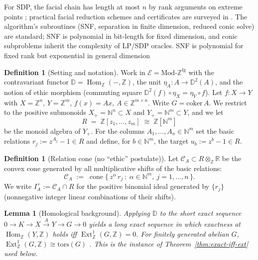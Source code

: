 \documentclass[12pt]{article}
\newcommand{\E}{\mathcal{E}}
\newcommand{\DD}{\mathbb{D}}
\newcommand{\Hom}{\operatorname{Hom}}
\newcommand{\Ext}{\operatorname{Ext}}
\theoremstyle{plain}
\newtheorem{lemma}[theorem]{Lemma}
\theoremstyle{definition}
\newtheorem{definition}[theorem]{Definition}
\theoremstyle{remark}
\numberwithin{equation}{section}
\begin{document}
For SDP, the facial chain has length at most $n$ by rank arguments on extreme points \cite{Pataki1998}; practical facial reduction schemes and certificates are surveyed in \cite{Pataki2013}. The algorithm's subroutines (SNF, separation in finite dimension, reduced conic solve) are standard; SNF is polynomial in bit-length for fixed dimension, and conic subproblems inherit the complexity of LP/SDP oracles. SNF is polynomial for fixed rank but exponential in general dimension

\begin{definition}[Setting and notation]
Work in $\E=\mathrm{Mod}\text{-}\mathbb Z^{\mathrm{fg}}$ with the contravariant functor $\DD=\Hom_{\mathbb Z}(-,\mathbb Z)$, the unit $\eta_A:A\to \DD^2(A)$, and the notion of ethic morphism (commuting square $\DD^2(f)\circ \eta_X=\eta_Y\circ f$). Let $f:X\to Y$ with $X=\mathbb Z^n$, $Y=\mathbb Z^m$, $f(x)=Ax$, $A\in\mathbb Z^{m\times n}$. Write $G=\mathrm{coker}\,A$. We restrict to the positive submonoids $X_+=\mathbb N^n\subset X$ and $Y_+=\mathbb N^m\subset Y$, and we let
\[
R \;=\; \mathbb Z[z_1,\dots,z_m]\;\cong\; \mathbb Z[\mathbb N^m]
\]
be the monoid algebra of $Y_+$. For the columns $A_1,\dots,A_n\in\mathbb N^m$ set the basic relations $r_j:=z^{A_j}-1\in R$ and define, for $b\in\mathbb N^m$, the target $u_b:=z^b-1\in R$.
\end{definition}

\begin{definition}[Relation cone (no “ethic” postulate)]
Let $\mathcal C_A\subset R\otimes_{\mathbb Z}\mathbb R$ be the convex cone generated by all multiplicative shifts of the basic relations:
\[
\mathcal C_A \;:=\; \operatorname{cone}\Big\{\, z^\alpha\,r_j \ :\ \alpha\in\mathbb N^m,\ j=1,\dots,n\,\Big\}.
\]
We write $I_A^+:=\mathcal C_A\cap R$ for the positive binomial ideal generated by $\{r_j\}$ (nonnegative integer linear combinations of their shifts).
\end{definition}

\begin{lemma}[Homological background]\label{lem:homological}
Applying $\DD$ to the short exact sequence $0\to K\to X\xrightarrow{A} Y\to G\to 0$ yields a long exact sequence in which exactness at $\Hom_{\mathbb Z}(Y,\mathbb Z)$ holds iff $\Ext^1_{\mathbb Z}(G,\mathbb Z)=0$. For finitely generated abelian $G$, $\Ext^1_{\mathbb Z}(G,\mathbb Z)\cong \mathrm{tors}(G)$ \cite{Weibel1994}. This is the instance of Theorem~\ref{thm:exact-iff-ext} used below.
\end{lemma}
\end{document}

